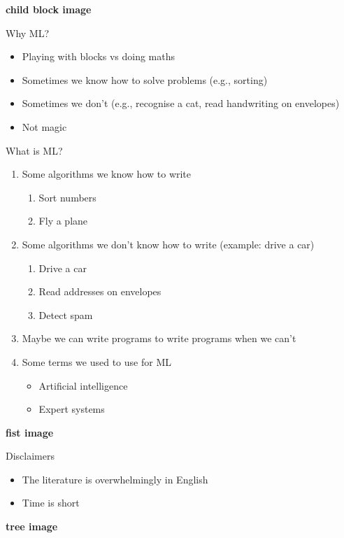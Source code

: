 




\textbf{child block image}

Why ML?
\begin{itemize}
\item Playing with blocks vs doing maths
\item Sometimes we know how to solve problems (e.g., sorting)
\item Sometimes we don't (e.g., recognise a cat, read handwriting on envelopes)
\item Not magic
\end{itemize}

What is ML?
\begin{enumerate}
\item Some algorithms we know how to write
  \begin{enumerate}
  \item Sort numbers
  \item Fly a plane
  \end{enumerate}
\item Some algorithms we don't know how to write (example: drive a car)
  \begin{enumerate}
  \item Drive a car 
  \item Read addresses on envelopes
  \item Detect spam
  \end{enumerate}
\item Maybe we can write programs to write programs when we can't
\item Some terms we used to use for ML
  \begin{itemize}
  \item Artificial intelligence
  \item Expert systems
  \end{itemize}
\end{enumerate}

\textbf{fist image}

Disclaimers
\begin{itemize}
\item The literature is overwhelmingly in English
\item Time is short
\end{itemize}

\textbf{tree image}

